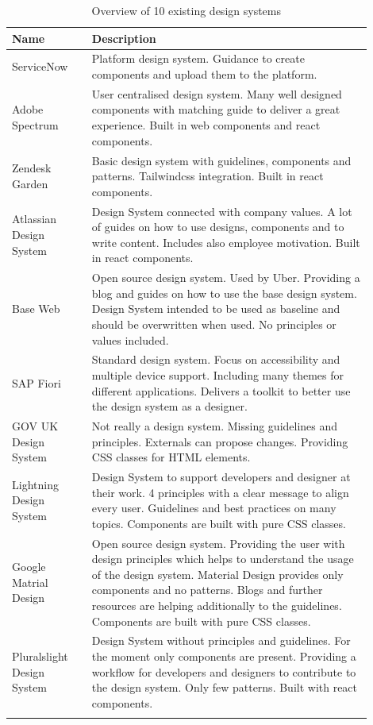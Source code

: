 \begin{longtable}{|p{0.2\linewidth} | p{0.7\linewidth}|}
\hline
 \textbf{Name} & \textbf{Description} \\ \hline
ServiceNow \cite{servicenow_servicenow_nodate}  & Platform design system.  Guidance to create components and upload them to the platform. \\ \hline
Adobe Spectrum  \cite{spectrum_adobe_spectrum_nodate} & User centralised design system. Many well designed components with matching guide to deliver a great experience. Built in web components and react components. \\ \hline
Zendesk Garden \cite{zendesk_garden_zendesk_nodate} & Basic design system with guidelines, components and patterns. Tailwindcss integration. Built in react components. \\ \hline

Atlassian Design System \cite{atlassian_design_system_atlassian_nodate} & Design System connected with company values. A lot of guides on how to use designs, components and to write content. Includes also employee motivation. Built in react components. \\ \hline
Base Web  \cite{base_base_nodate} & Open source design system. Used by Uber. Providing a blog and guides on how to use the base design system. Design System intended to be used as baseline and should be overwritten when used. No principles or values included. \\ \hline
SAP Fiori  \cite{sap_fiori_nodate} & Standard design system. Focus on accessibility and multiple device support. Including many themes for different applications. Delivers a toolkit to better use the design system as a designer.  \\ \hline
GOV UK Design System  \cite{govuk_govuk_nodate} & Not really a design system. Missing guidelines and principles. Externals can propose changes. Providing \ac{CSS} classes for \ac{HTML} elements.  \\ \hline
Lightning Design System \cite{lightning_design_system_lightning_nodate} & Design System to support developers and designer at their work. 4 principles with a clear message to align every user. Guidelines and best practices on many topics.  Components are built with pure \ac{CSS} classes. \\ \hline
Google Matrial Design \cite{google_material_2022} & Open source design system. Providing the user with design principles which helps to understand the usage of the design system. Material Design provides only components and no patterns. Blogs and further resources are helping additionally to the guidelines. Components are built with pure \ac{CSS} classes. \\ \hline
Pluralslight Design System \cite{pluralsight_ds_nodate} & Design System without principles and guidelines. For the moment only components are present. Providing a workflow for developers and designers to contribute to the design system.  Only few patterns. Built with react components.  \\ \hline
\caption{\label{tab:design_systems_in_the_wild} Overview of 10 existing design systems}
\end{longtable}

